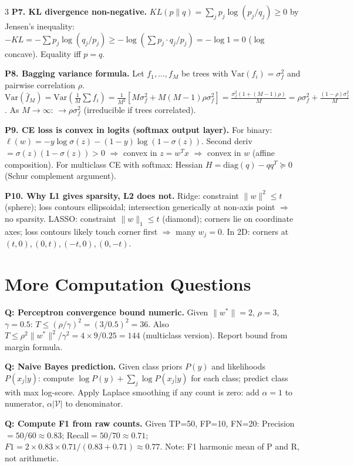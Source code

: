 \documentclass[8pt,fleqn]{extarticle}
\begin{document}
\begin{multicols}{3}
\textbf{P7. KL divergence non-negative.}
$KL(p\|q)=\sum_jp_j\log(p_j/q_j)\ge0$ by Jensen's inequality: $-KL=-\sum p_j\log(q_j/p_j)\ge-\log(\sum p_j\cdot q_j/p_j)=-\log 1=0$ ($\log$ concave). Equality iff $p=q$.

\textbf{P8. Bagging variance formula.}
Let $f_1,\ldots,f_M$ be trees with $\text{Var}(f_i)=\sigma_f^2$ and pairwise correlation $\rho$. $\text{Var}(\bar f_M)=\text{Var}(\frac1M\sum f_i)=\frac1{M^2}[M\sigma_f^2+M(M-1)\rho\sigma_f^2]=\frac{\sigma_f^2(1+(M-1)\rho)}{M}=\rho\sigma_f^2+\frac{(1-\rho)\sigma_f^2}{M}$. As $M\to\infty$: $\to\rho\sigma_f^2$ (irreducible if trees correlated).

\textbf{P9. CE loss is convex in logits (softmax output layer).}
For binary: $\ell(w)=-y\log\sigma(z)-(1-y)\log(1-\sigma(z))$. Second deriv $=\sigma(z)(1-\sigma(z))>0$ $\Rightarrow$ convex in $z=w^Tx$ $\Rightarrow$ convex in $w$ (affine composition). For multiclass CE with softmax: Hessian $H=\text{diag}(q)-qq^T\succeq0$ (Schur complement argument).

\textbf{P10. Why L1 gives sparsity, L2 does not.}
Ridge: constraint $\|w\|^2\le t$ (sphere); loss contours ellipsoidal; intersection generically at non-axis point $\Rightarrow$ no sparsity. LASSO: constraint $\|w\|_1\le t$ (diamond); corners lie on coordinate axes; loss contours likely touch corner first $\Rightarrow$ many $w_j=0$. In 2D: corners at $(t,0),(0,t),(-t,0),(0,-t)$.


\section*{More Computation Questions}

\textbf{Q: Perceptron convergence bound numeric.}
Given $\|w^*\|=2$, $\rho=3$, $\gamma=0.5$: $T\le(\rho/\gamma)^2=(3/0.5)^2=36$. Also $T\le\rho^2\|w^*\|^2/\gamma^2=4\times9/0.25=144$ (multiclass version). Report bound from margin formula.

\textbf{Q: Naive Bayes prediction.}
Given class priors $P(y)$ and likelihoods $P(x_j|y)$: compute $\log P(y)+\sum_j\log P(x_j|y)$ for each class; predict class with max log-score. Apply Laplace smoothing if any count is zero: add $\alpha=1$ to numerator, $\alpha|\mathcal V|$ to denominator.

\textbf{Q: Compute F1 from raw counts.}
Given TP=50, FP=10, FN=20: Precision$=50/60\approx0.83$; Recall$=50/70\approx0.71$; $F1=2\times0.83\times0.71/(0.83+0.71)\approx0.77$. Note: F1 harmonic mean of P and R, not arithmetic.


\end{multicols}
\end{document}
